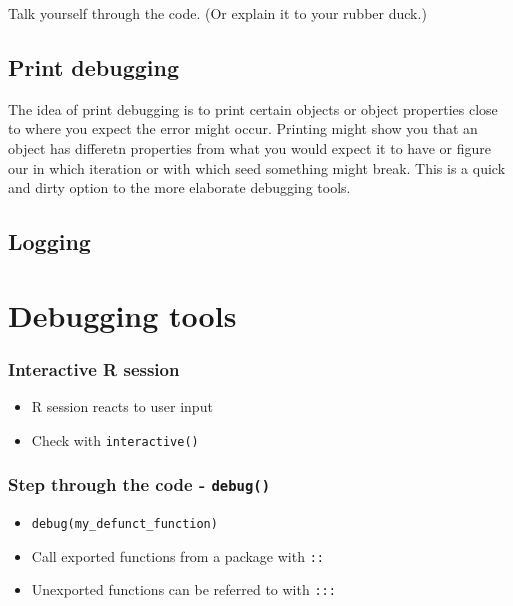 \documentclass[]{book}
\providecommand{\tightlist}{%
  \setlength{\itemsep}{0pt}\setlength{\parskip}{0pt}}
\begin{document}
Talk yourself through the code. (Or explain it to your rubber duck.)

\hypertarget{print-debugging}{%
\section{Print debugging}\label{print-debugging}}

The idea of print debugging is to print certain objects or object properties
close to where you expect the error might occur.
Printing might show you that an object has differetn properties from what you
would expect it to have or figure our in which iteration or with which seed
something might break.
This is a quick and dirty option to the more elaborate debugging tools.

\hypertarget{logging}{%
\section{Logging}\label{logging}}

\hypertarget{debugging-tools}{%
\chapter{Debugging tools}\label{debugging-tools}}

\hypertarget{interactive-r-session}{%
\subsection{Interactive R session}\label{interactive-r-session}}

\begin{itemize}
\tightlist
\item
  R session reacts to user input
\item
  Check with \texttt{interactive()}
\end{itemize}

\hypertarget{step-through-the-code---debug}{%
\subsection{\texorpdfstring{Step through the code - \texttt{debug()}}{Step through the code - debug()}}\label{step-through-the-code---debug}}

\begin{itemize}
\tightlist
\item
  \texttt{debug(my\_defunct\_function)}
\item
  Call exported functions from a package with \texttt{::}
\item
  Unexported functions can be referred to with \texttt{:::}
\end{itemize}
\end{document}
